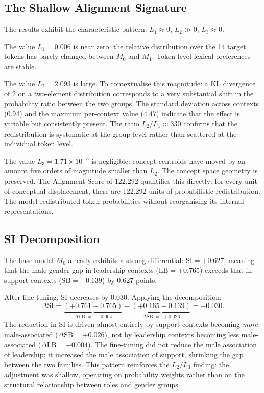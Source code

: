 \documentclass[11pt,a4paper]{article}
\begin{document}
\subsection{The Shallow Alignment Signature}

The results exhibit the characteristic pattern: $L_1 \approx 0$, $L_2 \gg 0$,
$L_3 \approx 0$.

The value $L_1 = 0.006$ is near zero: the relative distribution over the 14 target tokens
has barely changed between $M_0$ and $M_1$. Token-level lexical preferences are stable.

The value $L_2 = 2.093$ is large. To contextualise this magnitude: a KL divergence of 2
on a two-element distribution corresponds to a very substantial shift in the probability
ratio between the two groups. The standard deviation across contexts (0.94) and the
maximum per-context value (4.47) indicate that the effect is variable but consistently
present. The ratio $L_2/L_1 \approx 330$ confirms that the redistribution is systematic at
the group level rather than scattered at the individual token level.

The value $L_3 = 1.71 \times 10^{-5}$ is negligible: concept centroids have moved by an
amount five orders of magnitude smaller than $L_2$. The concept space geometry is
preserved. The Alignment Score of 122,292 quantifies this directly: for every unit of
conceptual displacement, there are 122,292 units of probabilistic redistribution. The model
redistributed token probabilities without reorganising its internal representations.

\subsection{SI Decomposition}

The base model $M_0$ already exhibits a strong differential: $\mathrm{SI} = +0.627$,
meaning that the male gender gap in leadership contexts ($\mathrm{LB} = +0.765$) exceeds
that in support contexts ($\mathrm{SB} = +0.139$) by 0.627 points.

After fine-tuning, $\mathrm{SI}$ decreases by 0.030. Applying the decomposition:
\[
  \Delta\mathrm{SI}
  = \underbrace{(+0.761 - 0.765)}_{\Delta\mathrm{LB}\;=\;-0.004}
  - \underbrace{(+0.165 - 0.139)}_{\Delta\mathrm{SB}\;=\;+0.026}
  = -0.030.
\]
The reduction in $\mathrm{SI}$ is driven almost entirely by support contexts becoming
\emph{more} male-associated ($\Delta\mathrm{SB} = +0.026$), not by leadership contexts
becoming less male-associated ($\Delta\mathrm{LB} = -0.004$). The fine-tuning did not
reduce the male association of leadership; it increased the male association of support,
shrinking the gap between the two families. This pattern reinforces the $L_2/L_3$
finding: the adjustment was shallow, operating on probability weights rather than on
the structural relationship between roles and gender groups.
\end{document}
